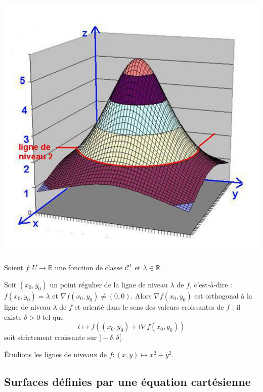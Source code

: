 \documentclass[french,11pt,twoside]{VcCours}
\begin{document}
\begin{center}
\includegraphics[scale=0.5]{niv}
\end{center}

\begin{Proposition}{} Soient $f : U \rightarrow \mathbb{R}$ une fonction de classe $\mathcal{C}^1$ et $\lambda \in \mathbb{R}$.

Soit $(x_0,y_0)$ un point régulier de la ligne de niveau $\lambda$ de $f$, c'est-à-dire : $f(x_0,y_0)=\lambda$ et $\nabla f (x_0,y_0) \neq (0,0)$. Alors $\nabla  f (x_0,y_0)$ est orthogonal  à la ligne de niveau $\lambda$ de $f$ et orienté dans le sens des valeurs croissantes de $f$ : il existe $\delta >0$ tel que 
$$ t \mapsto f((x_0,y_0) + t \nabla  f (x_0,y_0))$$
soit strictement croissante sur $]-\delta, \delta[$.
\end{Proposition}

\begin{Exemple}{} Étudions les lignes de niveaux de $f : (x,y) \mapsto x^2+y^2$.

\vspace{6cm}
\end{Exemple}



\subsection{Surfaces définies par une équation cartésienne}
\medskip
\end{document}
